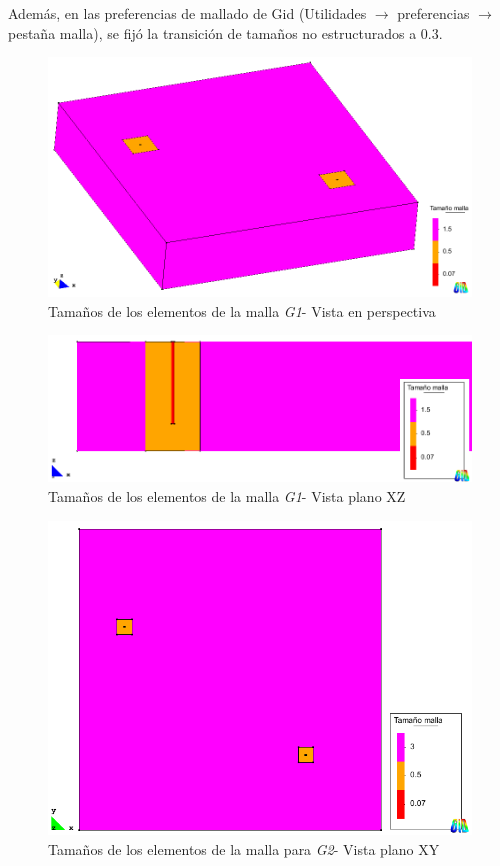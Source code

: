 \documentclass[10pt,a4paper,final]{article}
\begin{document}
Además, en las preferencias de mallado de Gid (Utilidades $\rightarrow$ preferencias $\rightarrow$ pestaña malla), se fijó la transición de tamaños no estructurados a $0.3$.
%
\begin{figure}[tbhp]
\centerline{\includegraphics[scale=0.35]{img/100m/100_perspec_tam_malla}}
\caption{Tamaños de los elementos de la malla \emph{G1}- Vista en perspectiva}
\label{100_perspec_tam_malla}
\end{figure}
%
\begin{figure}[tbhp]
\centerline{\includegraphics[scale=0.4]{img/100m/100_xz_tam_malla}}
\caption{Tamaños de los elementos de la malla \emph{G1}- Vista plano XZ}
\label{100_xz_tam_malla}
\end{figure}
\begin{figure}[tbhp]
\centerline{\includegraphics[scale=0.4]{img/200m/200_xy_tam_malla}}
\caption{Tamaños de los elementos de la malla para \emph{G2}- Vista plano XY}
\label{200_xy_tam_malla}
\end{figure}
\end{document}
